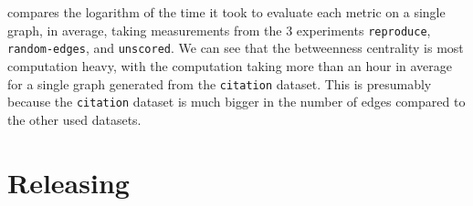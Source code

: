 


 compares the logarithm of the time it took to evaluate each metric on a single graph, in average, taking measurements from the 3 experiments \texttt{reproduce}, \texttt{random-edges}, and \texttt{unscored}.
We can see that the betweenness centrality is most computation heavy, with the computation taking more than an hour in average for a single graph generated from the \texttt{citation} dataset.
This is presumably because the \texttt{citation} dataset is much bigger in the number of edges compared to the other used datasets.




\section{Releasing \graffs}

